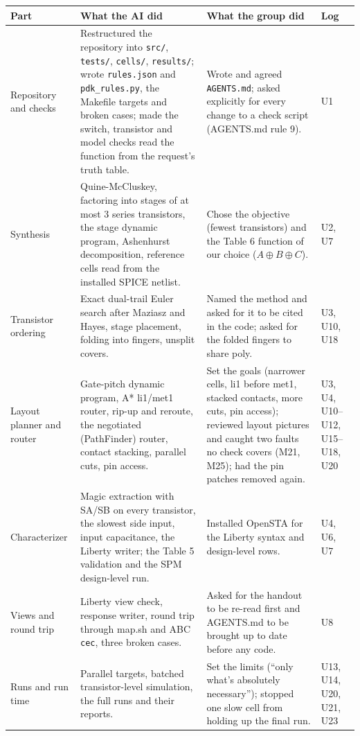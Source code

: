 \documentclass[10pt,a4paper]{article}
\newcommand{\code}[1]{\texttt{#1}}
\begin{document}
{\small
\begin{longtable}{@{}L{25mm}L{60mm}L{54mm}L{20mm}@{}}
\toprule
\textbf{Part} & \textbf{What the AI did} & \textbf{What the group did} & \textbf{Log}\\
\midrule\endhead
Repository and checks & Restructured the repository into \code{src/}, \code{tests/}, \code{cells/}, \code{results/}; wrote \code{rules.json} and \code{pdk\_rules.py}, the Makefile targets and broken cases; made the switch, transistor and model checks read the function from the request's truth table. & Wrote and agreed \code{AGENTS.md}; asked explicitly for every change to a check script (AGENTS.md rule 9). & U1\\
Synthesis & Quine-McCluskey, factoring into stages of at most 3 series transistors, the stage dynamic program, Ashenhurst decomposition, reference cells read from the installed SPICE netlist. & Chose the objective (fewest transistors) and the Table 6 function of our choice ($A \oplus B \oplus C$). & U2, U7\\
Transistor ordering & Exact dual-trail Euler search after Maziasz and Hayes, stage placement, folding into fingers, unsplit covers. & Named the method and asked for it to be cited in the code; asked for the folded fingers to share poly. & U3, U10, U18\\
Layout planner and router & Gate-pitch dynamic program, A* li1/met1 router, rip-up and reroute, the negotiated (PathFinder) router, contact stacking, parallel cuts, pin access. & Set the goals (narrower cells, li1 before met1, stacked contacts, more cuts, pin access); reviewed layout pictures and caught two faults no check covers (M21, M25); had the pin patches removed again. & U3, U4, U10--U12, U15--U18, U20\\
Characterizer & Magic extraction with SA/SB on every transistor, the slowest side input, input capacitance, the Liberty writer; the Table 5 validation and the SPM design-level run. & Installed OpenSTA for the Liberty syntax and design-level rows. & U4, U6, U7\\
Views and round trip & Liberty view check, response writer, round trip through map.sh and ABC \code{cec}, three broken cases. & Asked for the handout to be re-read first and AGENTS.md to be brought up to date before any code. & U8\\
Runs and run time & Parallel targets, batched transistor-level simulation, the full runs and their reports. & Set the limits (``only what's absolutely necessary''); stopped one slow cell from holding up the final run. & U13, U14, U20, U21, U23\\

\end{longtable}}
\end{document}

